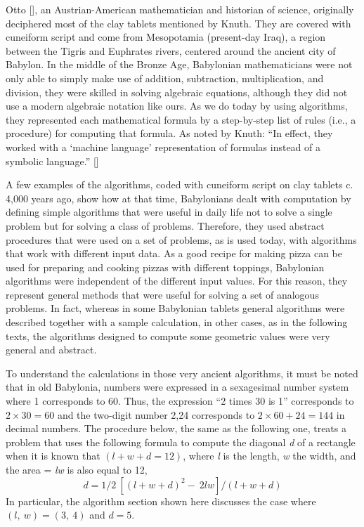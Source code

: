 Otto \citeauthor{chap:01:Neugebauer:1969} [\citeyear{chap:01:Neugebauer:1969}], an Austrian-American mathematician and historian of science, originally deciphered most of the clay tablets mentioned by Knuth. They are covered with cuneiform script and come from Mesopotamia (present-day Iraq), a region between the Tigris and Euphrates rivers, centered around the ancient city of Babylon. In the middle of the Bronze Age, Babylonian mathematicians were not only able to simply make use of addition, subtraction,\vadjust{\pagebreak} multiplication, and \hbox{division,} they were skilled in solving algebraic equations, although they did not use a modern algebraic notation like ours. As we do today by using algorithms, they represented each mathematical formula by a step-by-step list of rules (i.e., a procedure) for computing that formula. As noted by Knuth: ``In effect, they worked with a `machine language' representation of formulas instead of a symbolic language.'' [\citealt{chap:01:Knuth:1972}]


A few examples of the algorithms, coded with cuneiform script on clay tablets c. 4,000 years ago, show how at that time, Babylonians dealt with computation by defining simple algorithms that were useful in daily life not to solve a single problem but for solving a class of problems. Therefore, they used abstract procedures that were used on a set of problems, as is used today, with algorithms that work with different input data. As a good recipe for making pizza can be used for preparing and cooking pizzas with different toppings, Babylonian algorithms were independent of the different input values. For this reason, they represent general methods that were useful for solving a set of analogous problems. In fact, whereas in some Babylonian tablets general algorithms were described together with a sample calculation, in other cases, as in the following texts, the algorithms designed to compute some geometric values were very general and abstract.

To understand the calculations in those very ancient algorithms, it must be noted that in old Babylonia, numbers were expressed in a sexagesimal number system where 1 corresponds to 60. Thus, the expression ``2 times 30 is 1'' corresponds to $2 \times 30 = 60$ and the two-digit number 2,24 corresponds to $2 \times 60 + 24 = 144$ in decimal numbers. The procedure below, the same as the following one, treats a problem that uses the following formula to compute the diagonal \textit{d} of a rectangle when it is known that $(\textit{l} + \textit{w} + \textit{d} = 12)$, where \textit{l} is the length, \textit{w} the width, and the area = \textit{lw} is also equal to 12,
\begin{equation*}
d=1/2\ [(l+w+d)^{2} -\ 2lw]/(l+w+d)
\end{equation*}
\indent In particular, the algorithm section shown here discusses the case where $(l,\ w) = (3,\ 4)$ and $d = 5$.


